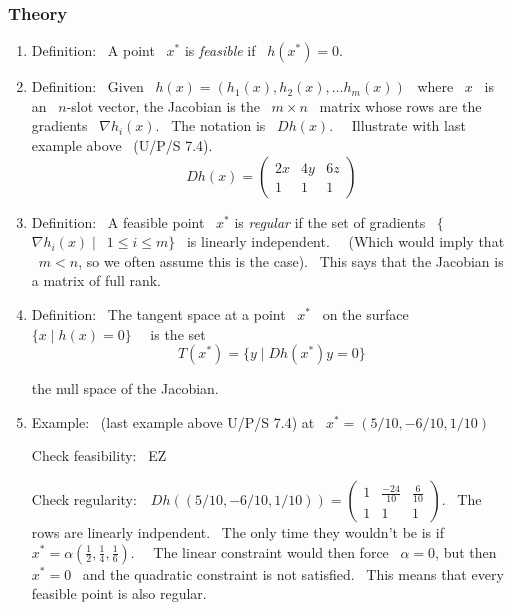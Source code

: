 \documentclass[12pt,thmsa]{article}
\begin{document}
\vspace{1pt}

\subsubsection{Theory}

\vspace{1pt}

\begin{enumerate}
\item  Definition: \ A point \ $x^{\ast }$ is \emph{feasible} if \ $%
h(x^{\ast })=0$.\bigskip

\item  Definition: \ Given \ $h(x)=(h_{1}(x),h_{2}(x),\ldots h_{m}(x))$ \
where \ $x$ \ is an \ $n$-slot vector, the Jacobian is the \ $m\times n$ \
matrix whose rows are the gradients \ $\nabla h_{i}(x)$. \ The notation is \
$Dh(x)$. \ \ Illustrate with last example above \ (U/P/S 7.4).
\[
Dh(x)=\left(
\begin{array}{lll}
2x & 4y & 6z \\
1 & 1 & 1
\end{array}
\right)
\]
\bigskip

\item  Definition: \ A feasible point \ $x^{\ast }$ is \emph{regular} if the
set of gradients \ $\{$\ $\nabla h_{i}(x)\mid $\ $1\leq i\leq m\}$ \ is
linearly independent. \ \ (Which would imply that \ $m<n$, so we often
assume this is the case). \ This says that the Jacobian is a matrix of full
rank.\bigskip

\item  Definition: \ The tangent space at a point \ $x^{\ast }$ \ on the
surface \ $\{x\mid h(x)=0\}$ \ \ is the set
\[
T(x^{\ast })=\{y\mid Dh(x^{\ast })y=0\}
\]

the null space of the Jacobian.\bigskip

\item  Example: \ (last example above U/P/S 7.4) at \ $x^{\ast
}=(5/10,-6/10,1/10)$

Check feasibility: \ EZ

Check regularity: $\ \ \ Dh((5/10,-6/10,1/10))=\left(
\begin{array}{lll}
1 & \frac{-24}{10} & \frac{6}{10} \\
1 & 1 & 1
\end{array}
\right) $. \ The rows are linearly indpendent. \ The only time they wouldn't
be is if \ \ $x^{\ast }=\alpha (\frac{1}{2},\frac{1}{4},\frac{1}{6})$. \ \
The linear constraint would then force \ $\alpha =0$, but then \ $x^{\ast }=0
$ \ and the quadratic constraint is not satisfied. \ This means that every
feasible point is also regular.


\end{enumerate}
\end{document}
